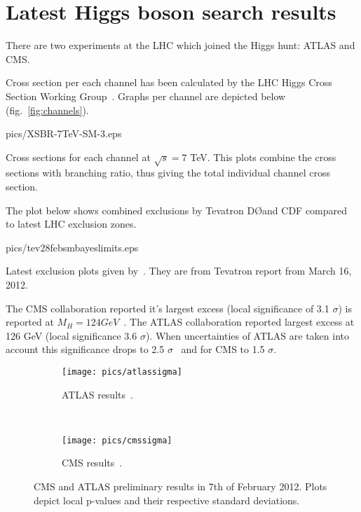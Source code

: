 \section{Latest Higgs boson search results}

There are two experiments at the LHC which joined the Higgs hunt: ATLAS and CMS.

Cross section per each channel has been calculated by the LHC Higgs Cross Section Working Group~\cite{CERN}. Graphs per channel are 
depicted below (fig.~\ref{fig:channels}).

\vspace{12pt}

\begin{myfig}[8cm]{pics/XSBR-7TeV-SM-3.eps}
	\caption{Cross sections for each channel at $\sqrt{s} = 7$ TeV. This plots combine the cross sections with branching ratio,
		thus giving the total individual channel cross section.}
	\label{fig:channels}
\end{myfig}

The plot below shows combined exclusions by Tevatron D\O and CDF compared to latest LHC exclusion zones.

\begin{myfig}[9cm]{pics/tev28febsmbayeslimits.eps}
	\caption{Latest exclusion plots given by~\cite{tev:review}. They are from Tevatron report from March 16, 2012.}
	\label{fig:exclusions}
\end{myfig}

The CMS collaboration reported it's largest excess (local significance of 3.1 $\sigma$) is reported at $M_H = 124 GeV$~\cite{cms:prelim}.
The ATLAS collaboration reported largest excess at 126 GeV (local significance 3.6 $\sigma$). When
uncertainties of ATLAS are taken into account this significance drops to 2.5 $\sigma$~\cite{atlas:prelim} and for CMS to 1.5 $\sigma$.

\begin{figure}[H]
	\centering
	\begin{subfigure}[b]{0.45\textwidth}
		\centering
		\texttt{[image: pics/atlassigma]}
		\caption{ATLAS results~\cite{atlas:prelim}.}
		\label{fig:atlas:prelim}
	\end{subfigure}~
	\begin{subfigure}[b]{0.45\textwidth}
		\centering
		\texttt{[image: pics/cmssigma]}
		\caption{CMS results~\cite{cms:prelim}.}
		\label{fig:cms:prelim}
	\end{subfigure}
	\caption{CMS and ATLAS preliminary results in 7th of February 2012. Plots depict local p-values and their respective standard deviations.}
	\label{cern:prelim}
\end{figure}

